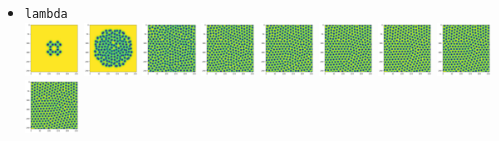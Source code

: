 \begin{itemize}
\item {\tt lambda}\\
\includegraphics[height=1.4cm]{python_codes/fieldstone_171/pearson93_rand/lambda_solution_0001000_u}
\includegraphics[height=1.4cm]{python_codes/fieldstone_171/pearson93_rand/lambda_solution_0005000_u}
\includegraphics[height=1.4cm]{python_codes/fieldstone_171/pearson93_rand/lambda_solution_0010000_u}
\includegraphics[height=1.4cm]{python_codes/fieldstone_171/pearson93_rand/lambda_solution_0015000_u}
\includegraphics[height=1.4cm]{python_codes/fieldstone_171/pearson93_rand/lambda_solution_0020000_u}
\includegraphics[height=1.4cm]{python_codes/fieldstone_171/pearson93_rand/lambda_solution_0030000_u}
\includegraphics[height=1.4cm]{python_codes/fieldstone_171/pearson93_rand/lambda_solution_0040000_u}
\includegraphics[height=1.4cm]{python_codes/fieldstone_171/pearson93_rand/lambda_solution_0050000_u}
\includegraphics[height=1.4cm]{python_codes/fieldstone_171/pearson93_rand/lambda_solution_final_u}\\

\end{itemize}
